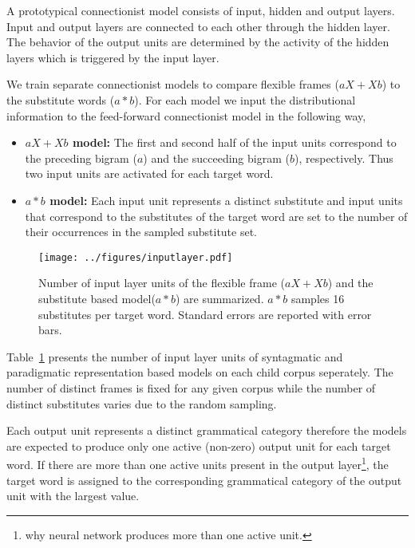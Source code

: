 A prototypical connectionist model consists of input, hidden and
output layers.  Input and output layers are connected to each other
through the hidden layer.  The behavior of the output units are
determined by the activity of the hidden layers which is triggered by
the input layer.

We train separate connectionist models to compare flexible frames ($aX+Xb$) to
the substitute words ($a*b$).  For each model we input the distributional
information to the feed-forward connectionist model in the following way,

\begin{itemize}
\item {\bf$aX+Xb$ model:} The first and second half of the input units
  correspond to the preceding bigram ($a$) and the succeeding bigram
  ($b$), respectively.  Thus two input units are activated for each
  target word.
\item {\bf $a*b$ model:} Each input unit represents a distinct
  substitute and input units that correspond to the substitutes of the
  target word are set to the number of their occurrences in the
  sampled substitute set.
\end{itemize}

\begin{figure}[ht]
  \centering
  \texttt{[image: ../figures/inputlayer.pdf]}
  \caption{Number of input layer units of the flexible frame ($aX + Xb$) and
    the substitute based model($a*b$) are summarized.  $a*b$ samples 16
    substitutes per target word.  Standard errors are reported with error bars. 
  }
  \label{fig:inputunits}
\end{figure}
Table~\ref{fig:inputunits} presents the number of input layer units of
syntagmatic and paradigmatic representation based models on each child
corpus seperately.  The number of distinct frames is fixed for any
given corpus while the number of distinct substitutes varies due to
the random sampling.

Each output unit represents a distinct grammatical category therefore the
models are expected to produce only one active (non-zero) output unit for each
target word.  If there are more than one active units present in the output
layer\footnote{why neural network produces more than one active unit.}, the
target word is assigned to the corresponding grammatical category of the output
unit with the largest value.


